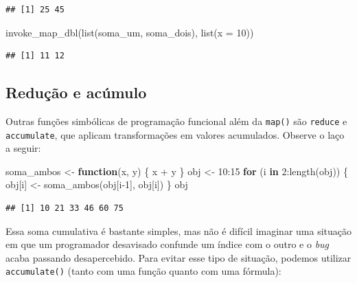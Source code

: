 \documentclass[
]{book}
\newenvironment{Shaded}{\begin{snugshade}}{\end{snugshade}}
\newcommand{\AttributeTok}[1]{\textcolor[rgb]{0.77,0.63,0.00}{#1}}
\newcommand{\ControlFlowTok}[1]{\textcolor[rgb]{0.13,0.29,0.53}{\textbf{#1}}}
\newcommand{\DecValTok}[1]{\textcolor[rgb]{0.00,0.00,0.81}{#1}}
\newcommand{\FunctionTok}[1]{\textcolor[rgb]{0.00,0.00,0.00}{#1}}
\newcommand{\NormalTok}[1]{#1}
\newcommand{\OtherTok}[1]{\textcolor[rgb]{0.56,0.35,0.01}{#1}}
\newcommand{\SpecialCharTok}[1]{\textcolor[rgb]{0.00,0.00,0.00}{#1}}
\begin{document}
\begin{verbatim}
## [1] 25 45
\end{verbatim}

\begin{Shaded}
\begin{Highlighting}[]
\FunctionTok{invoke\_map\_dbl}\NormalTok{(}\FunctionTok{list}\NormalTok{(soma\_um, soma\_dois), }\FunctionTok{list}\NormalTok{(}\AttributeTok{x =} \DecValTok{10}\NormalTok{))}
\end{Highlighting}
\end{Shaded}

\begin{verbatim}
## [1] 11 12
\end{verbatim}

\hypertarget{reduuxe7uxe3o-e-acuxfamulo}{%
\subsection{Redução e acúmulo}\label{reduuxe7uxe3o-e-acuxfamulo}}

Outras funções simbólicas de programação funcional além da \texttt{map()} são \texttt{reduce}
e \texttt{accumulate}, que aplicam transformações em valores acumulados. Observe o laço
a seguir:

\begin{Shaded}
\begin{Highlighting}[]
\NormalTok{soma\_ambos }\OtherTok{\textless{}{-}} \ControlFlowTok{function}\NormalTok{(x, y) \{ x }\SpecialCharTok{+}\NormalTok{ y \}}
\NormalTok{obj }\OtherTok{\textless{}{-}} \DecValTok{10}\SpecialCharTok{:}\DecValTok{15}
\ControlFlowTok{for}\NormalTok{ (i }\ControlFlowTok{in} \DecValTok{2}\SpecialCharTok{:}\FunctionTok{length}\NormalTok{(obj)) \{}
\NormalTok{  obj[i] }\OtherTok{\textless{}{-}} \FunctionTok{soma\_ambos}\NormalTok{(obj[i}\DecValTok{{-}1}\NormalTok{], obj[i])}
\NormalTok{\}}
\NormalTok{obj}
\end{Highlighting}
\end{Shaded}

\begin{verbatim}
## [1] 10 21 33 46 60 75
\end{verbatim}

Essa soma cumulativa é bastante simples, mas não é difícil imaginar uma situação
em que um programador desavisado confunde um índice com o outro e o \emph{bug} acaba
passando desapercebido. Para evitar esse tipo de situação, podemos utilizar
\texttt{accumulate()} (tanto com uma função quanto com uma fórmula):
\end{document}
